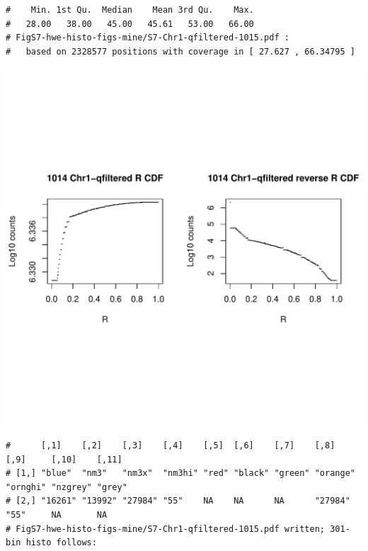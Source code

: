 \documentclass{article}\usepackage[]{graphicx}\usepackage[]{color}
\makeatletter
\def\maxwidth{ %
  \ifdim\Gin@nat@width>\linewidth
    \linewidth
  \else
    \Gin@nat@width
  \fi
}
\newenvironment{kframe}{%
 \def\at@end@of@kframe{}%
 \ifinner\ifhmode%
  \def\at@end@of@kframe{\end{minipage}}%
  \begin{minipage}{\columnwidth}%
 \fi\fi%
 \def\FrameCommand##1{\hskip\@totalleftmargin \hskip-\fboxsep
 \colorbox{shadecolor}{##1}\hskip-\fboxsep
     \hskip-\linewidth \hskip-\@totalleftmargin \hskip\columnwidth}%
 \MakeFramed {\advance\hsize-\width
   \@totalleftmargin\z@ \linewidth\hsize
   \@setminipage}}%
 {\par\unskip\endMakeFramed%
 \at@end@of@kframe}
\newenvironment{knitrout}{}{} %
\makeatother
\begin{document}
\begin{knitrout}
\begin{kframe}
\begin{verbatim}
#    Min. 1st Qu.  Median    Mean 3rd Qu.    Max. 
#   28.00   38.00   45.00   45.61   53.00   66.00 
# FigS7-hwe-histo-figs-mine/S7-Chr1-qfiltered-1015.pdf :
#   based on 2328577 positions with coverage in [ 27.627 , 66.34795 ]
\end{verbatim}
\end{kframe}
\includegraphics[width=\maxwidth]{FigS7-hwe-histo-figs-knitr/unnamed-chunk-10-50} 
\begin{kframe}\begin{verbatim}
#      [,1]    [,2]    [,3]    [,4]    [,5]  [,6]    [,7]    [,8]     [,9]     [,10]    [,11] 
# [1,] "blue"  "nm3"   "nm3x"  "nm3hi" "red" "black" "green" "orange" "ornghi" "nzgrey" "grey"
# [2,] "16261" "13992" "27984" "55"    NA    NA      NA      "27984"  "55"     NA       NA    
# FigS7-hwe-histo-figs-mine/S7-Chr1-qfiltered-1015.pdf written; 301-bin histo follows:
\end{verbatim}
\end{kframe}

\end{knitrout}
\end{document}
